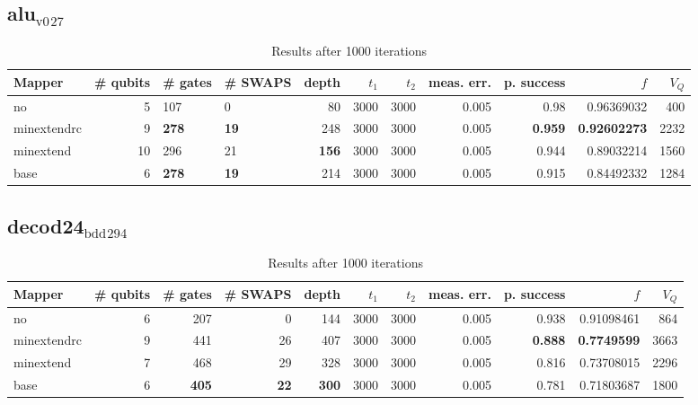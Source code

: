 \documentclass[11pt]{article}
\begin{document}
\subsection{alu\(_{\text{v0}}\)\(_{\text{27}}\)}
\label{sec:org7bd3145}
\begin{table}[H]
\caption{\label{tab:org0b2d4e9}
Results after 1000 iterations}
\centering
\small
\begin{tabular}{lrllrrrrrrr}
\hline
Mapper & \# qubits & \# gates & \# SWAPS & depth & \(t_1\) & \(t_2\) & meas. err. & p. success & \(f\) & \(V_Q\)\\
\hline
no & 5 & 107 & 0 & 80 & 3000 & 3000 & 0.005 & 0.98 & 0.96369032 & 400\\
\hline
minextendrc & 9 & \textbf{278} & \textbf{19} & 248 & 3000 & 3000 & 0.005 & \textbf{0.959} & \textbf{0.92602273} & 2232\\
minextend & 10 & 296 & 21 & \textbf{156} & 3000 & 3000 & 0.005 & 0.944 & 0.89032214 & 1560\\
base & 6 & \textbf{278} & \textbf{19} & 214 & 3000 & 3000 & 0.005 & 0.915 & 0.84492332 & 1284\\
\hline
\end{tabular}
\end{table}
\subsection{decod24\(_{\text{bdd}}\)\(_{\text{294}}\)}
\label{sec:orga425c87}
\begin{table}[H]
\caption{\label{tab:org8fab406}
Results after 1000 iterations}
\centering
\small
\begin{tabular}{lrrrrrrrrrr}
\hline
Mapper & \# qubits & \# gates & \# SWAPS & depth & \(t_1\) & \(t_2\) & meas. err. & p. success & \(f\) & \(V_Q\)\\
\hline
no & 6 & 207 & 0 & 144 & 3000 & 3000 & 0.005 & 0.938 & 0.91098461 & 864\\
\hline
minextendrc & 9 & 441 & 26 & 407 & 3000 & 3000 & 0.005 & \textbf{0.888} & \textbf{0.7749599} & 3663\\
minextend & 7 & 468 & 29 & 328 & 3000 & 3000 & 0.005 & 0.816 & 0.73708015 & 2296\\
base & 6 & \textbf{405} & \textbf{22} & \textbf{300} & 3000 & 3000 & 0.005 & 0.781 & 0.71803687 & 1800\\
\hline
\end{tabular}
\end{table}
\end{document}
